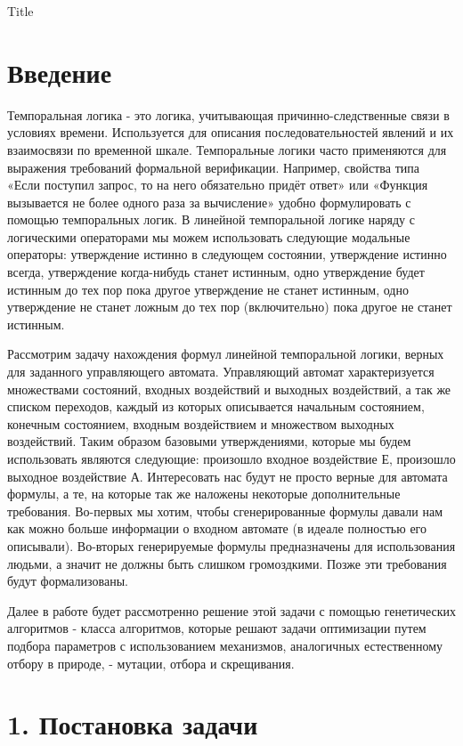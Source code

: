 \documentclass[12pt]{article}
\begin{document}
Title

\section*{Введение}

Темпоральная логика - это логика, учитывающая причинно-следственные связи в условиях времени.
Используется для описания последовательностей явлений и их взаимосвязи по временной шкале.
Темпоральные логики часто применяются для выражения требований формальной верификации.
Например, свойства типа «Если поступил запрос, то на него обязательно придёт ответ» или
«Функция вызывается не более одного раза за вычисление» удобно формулировать с помощью темпоральных логик.
В линейной темпоральной логике наряду с логическими операторами мы можем использовать следующие модальные операторы:
утверждение истинно в следующем состоянии, утверждение истинно всегда, утверждение когда-нибудь станет истинным,
одно утверждение будет истинным до тех пор пока другое утверждение не станет истинным,
одно утверждение не станет ложным до тех пор (включительно) пока другое не станет истинным.

Рассмотрим задачу нахождения формул линейной темпоральной логики, верных для заданного управляющего автомата.
Управляющий автомат характеризуется множествами состояний, входных воздействий и выходных воздействий,
а так же списком переходов, каждый из которых описывается начальным состоянием, конечным состоянием,
входным воздействием и множеством выходных воздействий. Таким образом базовыми утверждениями,
которые мы будем использовать являются следующие: произошло входное воздействие Е, произошло выходное воздействие А.
Интересовать нас будут не просто верные для автомата формулы, а те, на которые так же наложены некоторые
дополнительные требования. Во-первых мы хотим, чтобы сгенерированные формулы давали нам как можно больше информации
о входном автомате (в идеале полностью его описывали). Во-вторых генерируемые формулы предназначены для
использования людьми, а значит не должны быть слишком громоздкими. Позже эти требования будут формализованы.

Далее в работе будет рассмотренно решение этой задачи с помощью генетических алгоритмов - класса алгоритмов,
которые решают задачи оптимизации путем подбора параметров с использованием механизмов, аналогичных естественному
отбору в природе, - мутации, отбора и скрещивания.

\section*{1. Постановка задачи}
\end{document}
